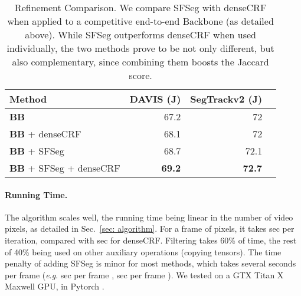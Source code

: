 \documentclass{article}
\newcommand{\eg}{\textit{e}.\textit{g}. }
\begin{document}
\begin{table}[t]
\begin{center}
	\begin{tabular}{l r r r}
		\toprule
		\multicolumn{1}{l}{Method} &
		\multicolumn{1}{p{1cm}}{\raggedleft DAVIS (J)} &
		\multicolumn{1}{p{2.1cm}}{\raggedleft SegTrackv2 (J)} \\
        \midrule
		\textbf{BB} & 67.2 & 72\\
		\textbf{BB} + denseCRF & 68.1 & 72\\
\textbf{BB} + SFSeg& 68.7 & 72.1 \\
		\textbf{BB} + SFSeg + denseCRF & \textbf{69.2} & \textbf{72.7} \\
		\bottomrule
    \end{tabular}
\end{center}
\caption{Refinement Comparison. We compare SFSeg with denseCRF when applied to a competitive end-to-end Backbone (as detailed above). While SFSeg outperforms denseCRF when used individually, the two methods prove to be not only different, but also complementary, since combining them boosts the Jaccard score.}
\label{tab:backbone}
\vspace{-1em}
\end{table}

\paragraph{Running Time.} The algorithm scales well, the running time being linear in the number of video pixels, as detailed in Sec.~\ref{sec: algorithm}. For a frame of  pixels, it takes  sec per iteration, compared with  sec for denseCRF. Filtering takes 60\% of time, the rest of 40\% being used on other auxiliary operations (copying tensors). The time penalty of adding SFSeg is minor for most methods, which takes several seconds per frame (\eg  sec per frame \cite{osvoss},  sec per frame \cite{premvos}). We tested on a GTX Titan X Maxwell GPU, in Pytorch \cite{pytorch}.
\end{document}
